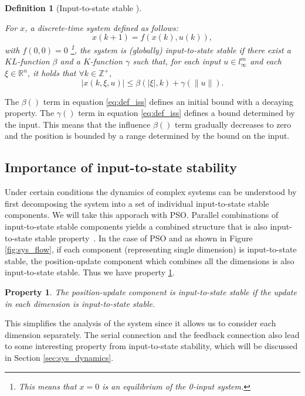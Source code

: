 \documentclass{sig-alternate}
\newtheorem{mydef}{Definition}
\newtheorem{myprop}{Property}
\begin{document}
\begin{mydef}[Input-to-state stable \cite{Jiang2001857}]
\label{def:iss}

For $ x $, a discrete-time system defined as follows:
\begin{equation}
\label{eq:dis_nonlinear}
x(k+1) = f( x(k) , u(k) ),
\end{equation}
with $ f(0,0) = 0 $
\footnote{This means that $ x = 0 $ is an equilibrium of the 0-input system.}, the system is \emph{(globally) input-to-state stable} if there exist a $ KL $-function $ \beta  $ and a $ K $-function $ \gamma $ such that, for each input $ u \in l^{m}_{\infty} $ and each $ \xi \in \mathbb{R}^{n} $, it holds that $  \forall k \in \mathbb{Z}^{+} $,
\begin{equation}
\label{eq:def_iss}
| x(k, \xi, u) | \leq \beta (| \xi |, k) + \gamma (\lVert u \rVert).
\end{equation}
\end{mydef}

The $ \beta () $ term in equation \eqref{eq:def_iss} defines an initial bound with a decaying property.
The $ \gamma () $ term in equation \eqref{eq:def_iss} defines a bound determined by the input.
This means that the influence $ \beta () $ term gradually decreases to zero and the position is bounded by a range determined by the bound on the input.

\subsection{Importance of input-to-state stability}
\label{sec:connect_iss_to_pso}

Under certain conditions the dynamics of complex systems can be understood by first decomposing the system into a set of individual input-to-state stable components. We will take this apporach with PSO. 
Parallel combinations of input-to-state stable components yields a combined structure that is also input-to-state stable property~\cite{khalil1996nonlinear}.
In the case of PSO and as shown in Figure \ref{fig:sys_flow}, if each component (representing single dimension) is input-to-state stable, the position-update component which combines all the dimensions is also input-to-state stable.
Thus we have property \ref{prop:iss:parallel}.
\begin{myprop}
\label{prop:iss:parallel}
The position-update component is input-to-state stable if the update in each dimension is input-to-state stable.
\end{myprop}
This simplifies the analysis of the system since it allows us to consider each dimension separately.
The serial connection and the feedback connection also lead to some interesting property from input-to-state stability, which will be discussed in Section \ref{sec:sys_dynamics}.
\end{document}
